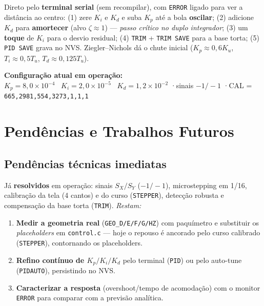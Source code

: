 \documentclass[11pt,a4paper,oneside]{article}
\begin{document}
\begin{infobox}
Direto pelo \textbf{terminal serial} (sem recompilar), com \texttt{ERROR} ligado
para ver a distância ao centro: (1) zere $K_i$ e $K_d$ e suba $K_p$ até a bola
\textbf{oscilar}; (2) adicione $K_d$ para \textbf{amortecer} (alvo $\zeta\approx 1$)
— \emph{passo crítico no duplo integrador}; (3) um \textbf{toque} de $K_i$ para o
desvio residual; (4) \texttt{TRIM} + \texttt{TRIM SAVE} para a base torta;
(5) \texttt{PID SAVE} grava no NVS. Ziegler–Nichols dá o chute inicial
($K_p\approx 0{,}6K_u$, $T_i\approx 0{,}5T_u$, $T_d\approx 0{,}125T_u$).
\end{infobox}

\begin{keybox}
\textbf{Configuração atual em operação:}\quad
$K_p = 8{,}0\times10^{-4}\;\;\; K_i = 2{,}0\times10^{-5}\;\;\; K_d = 1{,}2\times10^{-2}$
\quad·\quad sinais $-1/-1$ \quad·\quad CAL = \texttt{665,2981,554,3273,1,1,1}
\end{keybox}

\section{Pendências e Trabalhos Futuros}

\subsection{Pendências técnicas imediatas}

Já \textbf{resolvidos} em operação: sinais $S_X/S_Y$ ($-1/-1$), microstepping em
1/16, calibração da tela (4 cantos) e do curso (\texttt{STEPPER}), detecção robusta
e compensação da base torta (\texttt{TRIM}). \emph{Restam:}

\begin{enumerate}
  \item \textbf{Medir a geometria real} (\texttt{GEO\_D/E/F/G/HZ}) com paquímetro
  e substituir os \emph{placeholders} em \texttt{control.c} — hoje o repouso é
  ancorado pelo curso calibrado (\texttt{STEPPER}), contornando os placeholders.
  \item \textbf{Refino contínuo de $K_p/K_i/K_d$} pelo terminal (\texttt{PID}) ou
  pelo auto-tune (\texttt{PIDAUTO}), persistindo no NVS.
  \item \textbf{Caracterizar a resposta} (overshoot/tempo de acomodação) com o
  monitor \texttt{ERROR} para comparar com a previsão analítica.
\end{enumerate}
\end{document}
